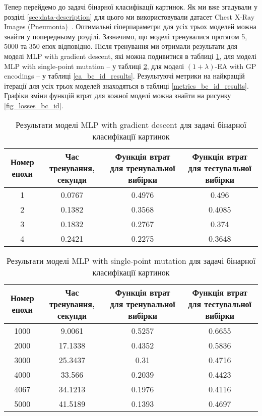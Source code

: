 Тепер перейдемо до задачі бінарної класифікації картинок. Як ми вже згадували у розділі \ref{sec:data-description} для цього ми використовували датасет Chest X-Ray Images (Pneumonia)~\cite{ct32}. Оптимальні гіперпараметри для усіх трьох моделей можна знайти у попередньому розділі. Зазначимо, що моделі тренувалися протягом 5, 5000 та 350 епох відповідно. Після тренування ми отримали результати для моделі MLP with gradient descent, які можна подивитися в таблиці \ref{mlp_gd_bc_id_results}, для моделі MLP with single-point mutation -- у таблиці \ref{mlp_spm_bc_id_results}, для моделі $(1+\lambda)$-EA with GP encodings -- у таблиці \ref{ea_bc_id_results}. Результуючі метрики на найкращій ітерації для усіх трьох моделей знаходяться в таблиці \ref{metrics_bc_id_results}. Графіки зміни функцій втрат для кожної моделі можна знайти на рисунку \ref{fig_losses_bc_id}.

\begin{table}[ht]
	\caption{Результати моделі MLP with gradient descent для задачі бінарної класифікації картинок}
	\label{mlp_gd_bc_id_results}
	\centering
	\begin{adjustbox}{max width=\textwidth}
		\begin{tabular}{|c|c|c|c|}
			\hline 
			Номер епохи & Час тренування, секунди & Функція втрат для тренувальної вибірки & Функція втрат для тестувальної вибірки \\
			\hline 
			1 & 0.0767 & 0.4976 & 0.496 \\
			\hline 
			2 & 0.1382 & 0.3568 & 0.4085 \\
			\hline
			3 & 0.1832 & 0.2767 & 0.374 \\
			\hline
			4 & 0.2421 & 0.2275 & 0.3648 \\
			\hline
		\end{tabular}
	\end{adjustbox}
\end{table}

\begin{table}[ht]
	\caption{Результати моделі MLP with single-point mutation для задачі бінарної класифікації картинок}
	\label{mlp_spm_bc_id_results}
	\centering
	\begin{adjustbox}{max width=\textwidth}
		\begin{tabular}{|c|c|c|c|}
			\hline 
			Номер епохи & Час тренування, секунди & Функція втрат для тренувальної вибірки & Функція втрат для тестувальної вибірки \\
			\hline 
			1000 & 9.0061 & 0.5257 & 0.6655 \\
			\hline 
			2000 & 17.1338 & 0.4352 & 0.5836 \\
			\hline
			3000 & 25.3437 & 0.31 & 0.4716 \\
			\hline
			4000 & 33.566 & 0.2039 & 0.4423 \\
			\hline
			4067 & 34.1213 & 0.1976 & 0.4116 \\
			\hline
			5000 & 41.5189 & 0.1393 & 0.4697 \\
			\hline
		\end{tabular}
	\end{adjustbox}
\end{table}

